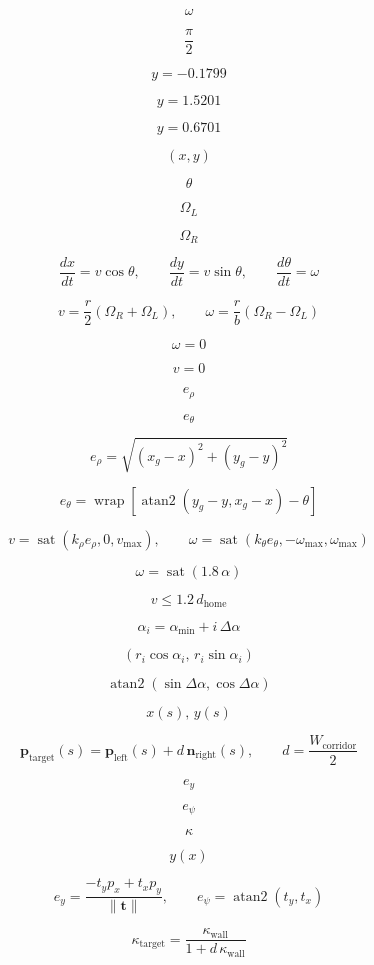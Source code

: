 \documentclass{article}
\begin{document}
\[
\omega
\]

\[
\frac{\pi}{2}
\]

\[
y=-0.1799
\]

\[
y=1.5201
\]

\[
y=0.6701
\]

\[
(x,y)
\]

\[
\theta
\]

\[
\Omega_L
\]

\[
\Omega_R
\]

\[
\frac{dx}{dt}=v\cos\theta,\qquad \frac{dy}{dt}=v\sin\theta,\qquad \frac{d\theta}{dt}=\omega
\]

\[
v=\frac{r}{2}(\Omega_R+\Omega_L),\qquad \omega=\frac{r}{b}(\Omega_R-\Omega_L)
\]

\[
\omega=0
\]

\[
v=0
\]

\[
e_\rho
\]

\[
e_\theta
\]

\[
e_\rho=\sqrt{\left(x_g-x\right)^2+\left(y_g-y\right)^2}
\]

\[
e_\theta=\operatorname{wrap}\left[\operatorname{atan2}\left(y_g-y,x_g-x\right)-\theta\right]
\]

\[
v=\operatorname{sat}(k_\rho e_\rho,0,v_{\max}),\qquad \omega=\operatorname{sat}(k_\theta e_\theta,-\omega_{\max},\omega_{\max})
\]

\[
\omega=\operatorname{sat}(1.8\,\alpha)
\]

\[
v\leq1.2\,d_{\mathrm{home}}
\]

\[
\alpha_i=\alpha_{\min}+i\,\Delta\alpha
\]

\[
(r_i\cos\alpha_i,\,r_i\sin\alpha_i)
\]

\[
\operatorname{atan2}(\sin\Delta\alpha,\cos\Delta\alpha)
\]

\[
x(s),\,y(s)
\]

\[
\mathbf{p}_{\mathrm{target}}(s)=\mathbf{p}_{\mathrm{left}}(s)+d\,\mathbf{n}_{\mathrm{right}}(s),\qquad d=\frac{W_{\mathrm{corridor}}}{2}
\]

\[
e_y
\]

\[
e_\psi
\]

\[
\kappa
\]

\[
y(x)
\]

\[
e_y=\frac{-t_y p_x+t_x p_y}{\lVert\mathbf{t}\rVert},\qquad e_\psi=\operatorname{atan2}(t_y,t_x)
\]

\[
\kappa_{\mathrm{target}}=\frac{\kappa_{\mathrm{wall}}}{1+d\,\kappa_{\mathrm{wall}}}
\]
\end{document}
